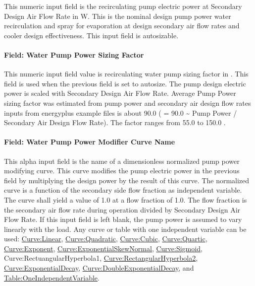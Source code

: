 This numeric input field is the recirculating pump electric power at Secondary Design Air Flow Rate in W. This is the nominal design pump power water recirculation and spray for evaporation at design secondary air flow rates and cooler design effectiveness. This input field is autosizable.

\paragraph{Field: Water Pump Power Sizing Factor}\label{field-water-pump-power-sizing-factor-1}

This numeric input field value is recirculating water pump sizing factor in \si{\wattperVolumeFlowRate}. This field is used when the previous field is set to autosize. The pump design electric power is scaled with Secondary Design Air Flow Rate. Average Pump Power sizing factor was estimated from pump power and secondary air design flow rates inputs from energyplus example files is about 90.0 \si{\wattperVolumeFlowRate} ( = 90.0 \textasciitilde{} Pump Power / Secondary Air Design Flow Rate). The factor ranges from 55.0 to 150.0 \si{\wattperVolumeFlowRate}.

\paragraph{Field: Water Pump Power Modifier Curve Name}\label{field-water-pump-power-modifier-curve-name-1}

This alpha input field is the name of a dimensionless normalized pump power modifying curve. This curve modifies the pump electric power in the previous field by multiplying the design power by the result of this curve. The normalized curve is a function of the secondary side flow fraction as independent variable. The curve shall yield a value of 1.0 at a flow fraction of 1.0. The flow fraction is the secondary air flow rate during operation divided by Secondary Design Air Flow Rate. If this input field is left blank, the pump power is assumed to vary linearly with the load. Any curve or table with one independent variable can be used: \hyperref[curvelinear]{Curve:Linear}, \hyperref[curvequadratic]{Curve:Quadratic}, \hyperref[curvecubic]{Curve:Cubic}, \hyperref[curvequartic]{Curve:Quartic}, \hyperref[curveexponent]{Curve:Exponent}, \hyperref[curveexponentialskewnormal]{Curve:ExponentialSkewNormal}, \hyperref[curvesigmoid]{Curve:Sigmoid}, Curve:RectuangularHyperbola1, \hyperref[curverectangularhyperbola2]{Curve:RectangularHyperbola2}, \hyperref[curveexponentialdecay]{Curve:ExponentialDecay}, \hyperref[curvedoubleexponentialdecay]{Curve:DoubleExponentialDecay}, and \hyperref[tableoneindependentvariable]{Table:OneIndependentVariable}.

